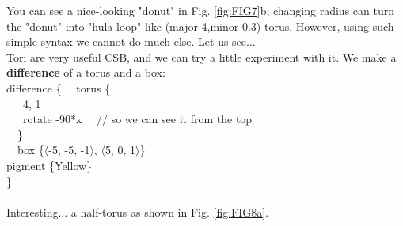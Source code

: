\documentclass[fleqn,10pt]{wlscirep}
\begin{document}
You can see a nice-looking "donut" in Fig. \ref{fig:FIG7}b, changing radius can turn the "donut" into "hula-loop"-like (major 4,minor 0.3) torus. However, using such simple syntax we cannot do much else. Let us see... \\
\newline
Tori are very useful CSB, and we can try a little experiment with it. We make a \textbf{difference} of a torus and a box:\\
{\color{blue}
difference \{
\ \ torus \{ \\
\ \ \ 4, 1  \\
\ \ \ rotate -90*x \ \ // so we can see it from the top  \\
\ \ \}  \\
\ \ box \{$\langle$-5, -5, -1$\rangle$, $\langle$5, 0, 1$\rangle$\}  \\
 pigment \{Yellow\}  \\
\}  \\ 
}\\
Interesting... a half-torus as shown in Fig. \ref{fig:FIG8a}.
\end{document}
